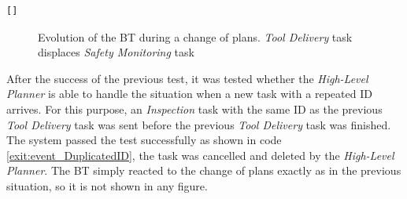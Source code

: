 \begin{lstlisting}[caption={Printed feedback messages after a change of plans. \emph{Tool Delivery} task displaces \emph{Safety Monitoring} task}, breaklines=true, label=exit:event_ChangeOfPlans]
	[]
\end{lstlisting}

\begin{figure}[htbp]
    \centering
    \hfill
    \hfill
    \caption{Evolution of the \gls{BT} during a change of plans. \emph{Tool Delivery} task displaces \emph{Safety Monitoring} task}
    \label{fig:event_ChangeOfPlans}
\end{figure}

After the success of the previous test, it was tested whether the \emph{High-Level Planner} is able to handle the situation when a new task with a repeated \gls{ID} arrives. For this purpose, an \emph{Inspection} task with the same \gls{ID} as the previous \emph{Tool Delivery} task was sent before the previous \emph{Tool Delivery} task was finished. The system passed the test successfully as shown in code \ref{exit:event_DuplicatedID}, the task was cancelled and deleted by the \emph{High-Level Planner}. The \gls{BT} simply reacted to the change of plans exactly as in the previous situation, so it is not shown in any figure.

